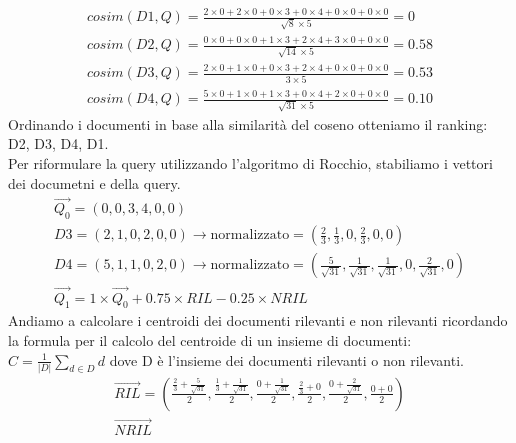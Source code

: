 \documentclass{report}
\begin{document}
	\[
		\begin{array}{l}
			cosim(D1, Q) = \frac{2 \times 0 + 2 \times 0 + 0 \times 3 + 0 \times 4 + 0 \times 0 + 0 \times 0}{\sqrt{8} \times 5} = 0\\
			cosim(D2, Q) = \frac{0 \times 0 + 0 \times 0 + 1 \times 3 + 2 \times 4 + 3 \times 0 + 0 \times 0}{\sqrt{14} \times 5} = 0.58\\
			cosim(D3, Q) = \frac{2 \times 0 + 1 \times 0 + 0 \times 3 + 2 \times 4 + 0 \times 0 + 0 \times 0}{3 \times 5} = 0.53\\
			cosim(D4, Q) = \frac{5 \times 0 + 1 \times 0 + 1 \times 3 + 0 \times 4 + 2 \times 0 + 0 \times 0}{\sqrt{31} \times 5} = 0.10
		\end{array}
	\]
	Ordinando i documenti in base alla similarità del coseno otteniamo il ranking: D2, D3, D4, D1.\\
	Per riformulare la query utilizzando l'algoritmo di Rocchio, stabiliamo i vettori dei documetni e della query.
	\[
		\begin{array}{l}
			\overrightarrow{Q_0} = (0, 0, 3, 4, 0, 0)\\
			D3 = (2, 1, 0, 2, 0, 0) \rightarrow \text{normalizzato} = \left(\frac{2}{3}, \frac{1}{3}, 0, \frac{2}{3}, 0, 0\right)\\
			D4 = (5, 1, 1, 0, 2, 0) \rightarrow \text{normalizzato} = \left(\frac{5}{\sqrt{31}}, \frac{1}{\sqrt{31}}, \frac{1}{\sqrt{31}}, 0, \frac{2}{\sqrt{31}}, 0\right)\\
			\overrightarrow{Q_1} = 1 \times \overrightarrow{Q_0} + 0.75 \times RIL - 0.25 \times NRIL
		\end{array}
	\]
	Andiamo a calcolare i centroidi dei documenti rilevanti e non rilevanti ricordando la formula per il calcolo del centroide di un insieme di documenti: $C = \frac{1}{|D|} \sum_{d \in D} d$ dove D è l'insieme dei documenti rilevanti o non rilevanti.
	\[
		\begin{array}{l}
			\overrightarrow{RIL} = (\frac{\frac{2}{3} + \frac{5}{\sqrt{31}}}{2}, \frac{\frac{1}{3} + \frac{1}{\sqrt{31}}}{2}, \frac{0 + \frac{1}{\sqrt{31}}}{2}, \frac{\frac{2}{3} + 0}{2}, \frac{0 + \frac{2}{\sqrt{31}}}{2}, \frac{0 + 0}{2})\\
			\overrightarrow{NRIL} 
		\end{array}
	\]
\end{document}
